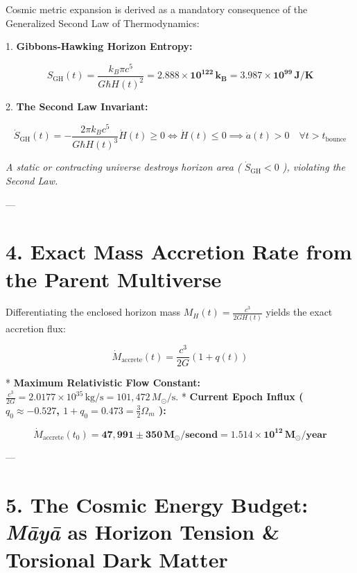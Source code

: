 \documentclass[11pt,a4paper]{article}
\theoremstyle{definition}
\theoremstyle{remark}
\begin{document}
Cosmic metric expansion is derived as a mandatory consequence of the Generalized Second Law of Thermodynamics:

1. \textbf{Gibbons-Hawking Horizon Entropy:}


\begin{equation}
S_{\text{GH}}(t) = \frac{k_B \pi c^5}{G \hbar H(t)^2} = \mathbf{2.888 \times 10^{122} \, k_B} = \mathbf{3.987 \times 10^{99} \, J/K}
\end{equation}


2. \textbf{The Second Law Invariant:}


\begin{equation}
\dot{S}_{\text{GH}}(t) = -\frac{2\pi k_B c^5}{G \hbar H(t)^3} \dot{H}(t) \ge 0 \iff \dot{H}(t) \le 0 \implies \boxed{\dot{a}(t) > 0 \quad \forall t > t_{\text{bounce}}}
\end{equation}


\textit{A static or contracting universe destroys horizon area ( $\dot{S}_{\text{GH}} < 0$ ), violating the Second Law.}

---

\section{4. Exact Mass Accretion Rate from the Parent Multiverse}

Differentiating the enclosed horizon mass $M_H(t) = \frac{c^3}{2 G H(t)}$ yields the exact accretion flux:


\begin{equation}
\dot{M}_{\text{accrete}}(t) = \frac{c^3}{2 G} (1 + q(t))
\end{equation}


* \textbf{Maximum Relativistic Flow Constant:} $\frac{c^3}{2 G} = 2.0177 \times 10^{35} \, \mathrm{kg/s} = 101,472 \, M_\odot/\mathrm{s}$.
* \textbf{Current Epoch Influx ( $q_0 \approx -0.527$, $1+q_0 = 0.473 = \frac{3}{2}\Omega_m$ ):}


\begin{equation}
\boxed{\dot{M}_{\text{accrete}}(t_0) = \mathbf{47,991 \pm 350 \, M_\odot / \text{second}} = \mathbf{1.514 \times 10^{12} \, M_\odot / \text{year}}}
\end{equation}


---

\section{5. The Cosmic Energy Budget: \textit{Māyā} as Horizon Tension \& Torsional Dark Matter}
\end{document}
